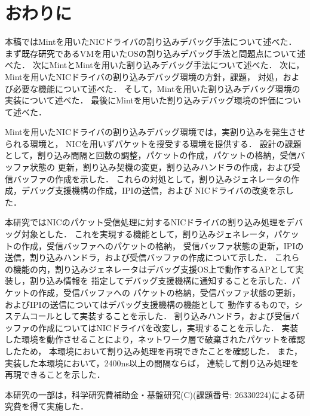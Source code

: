 \documentclass[submit,techreq,noauthor,dvipdfmx]{ipsj}
\begin{document}
\section{おわりに}\label{chap:conclusion}

本稿ではMintを用いたNICドライバの割り込みデバッグ手法について述べた．
まず既存研究であるVMを用いたOSの割り込みデバッグ手法と問題点について述べた．
次にMintとMintを用いた割り込みデバッグ手法について述べた．
次に，Mintを用いたNICドライバの割り込みデバッグ環境の方針，課題，
対処，および必要な機能について述べた．
そして，Mintを用いた割り込みデバッグ環境の実装について述べた．
最後にMintを用いた割り込みデバッグ環境の評価について述べた．

Mintを用いたNICドライバの割り込みデバッグ環境では，実割り込みを発生させられる環境と，
NICを用いずパケットを授受する環境を提供する．
設計の課題として，割り込み間隔と回数の調整，パケットの作成，パケットの格納，受信バッファ状態の
更新，割り込み契機の変更，割り込みハンドラの作成，および受信バッファの作成を示した．
これらの対処として，割り込みジェネレータの作成，デバッグ支援機構の作成，IPIの送信，および
NICドライバの改変を示した．

本研究ではNICのパケット受信処理に対するNICドライバの割り込み処理をデバッグ対象とした．
これを実現する機能として，割り込みジェネレータ，パケットの作成，受信バッファへのパケットの格納，
受信バッファ状態の更新，IPIの送信，割り込みハンドラ，および受信バッファの作成について示した．
これらの機能の内，割り込みジェネレータはデバッグ支援OS上で動作するAPとして実装し，割り込み情報を
指定してデバッグ支援機構に通知することを示した．パケットの作成，受信バッファへの
パケットの格納，受信バッファ状態の更新，およびIPIの送信についてはデバッグ支援機構の機能として
動作するもので，システムコールとして実装することを示した．
割り込みハンドラ，および受信バッファの作成についてはNICドライバを改変し，実現することを示した．
実装した環境を動作させることにより，ネットワーク層で破棄されたパケットを確認したため，
本環境において割り込み処理を再現できたことを確認した．
また，実装した本環境において，2400ns以上の間隔ならば，
連続して割り込み処理を再現できることを示した．


\begin{acknowledgment}
    本研究の一部は，科学研究費補助金・基盤研究(C)(課題番号: 26330224)による研究費を得て実施した．
\end{acknowledgment}


\end{document}
